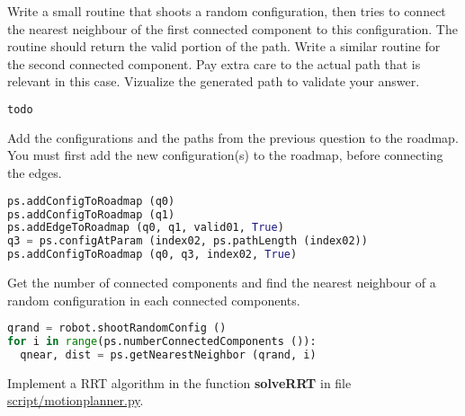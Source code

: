 \documentclass[10pt]{exam}
\begin{document}
\begin{questions}
\question Write a small routine that shoots a random configuration, then tries to connect the nearest neighbour of the first connected component to this configuration.
The routine should return the valid portion of the path. Write a similar routine for the second connected component. Pay extra care to the actual
path that is relevant in this case. Vizualize the generated path to validate your answer.
\begin{solutionorlines}
\begin{lstlisting}[language=python]
todo
\end{lstlisting}
\end{solutionorlines}

\question Add the configurations and the paths from the previous question to the roadmap. You must first add the new configuration(s) to the roadmap, before
connecting the edges.
\begin{solutionorlines}
\begin{lstlisting}[language=python]
ps.addConfigToRoadmap (q0)
ps.addConfigToRoadmap (q1)
ps.addEdgeToRoadmap (q0, q1, valid01, True)
q3 = ps.configAtParam (index02, ps.pathLength (index02))
ps.addConfigToRoadmap (q0, q3, index02, True)
\end{lstlisting}
\end{solutionorlines}

\question Get the number of connected components and find the nearest neighbour of a random configuration in each connected components.
\begin{solutionorlines}
\begin{lstlisting}[language=python]
qrand = robot.shootRandomConfig ()
for i in range(ps.numberConnectedComponents ()):
  qnear, dist = ps.getNearestNeighbor (qrand, i)
\end{lstlisting}
\end{solutionorlines}

\question Implement a RRT algorithm in the function \textbf{solveRRT} in file \url{script/motionplanner.py}.

\end{questions}
\end{document}
